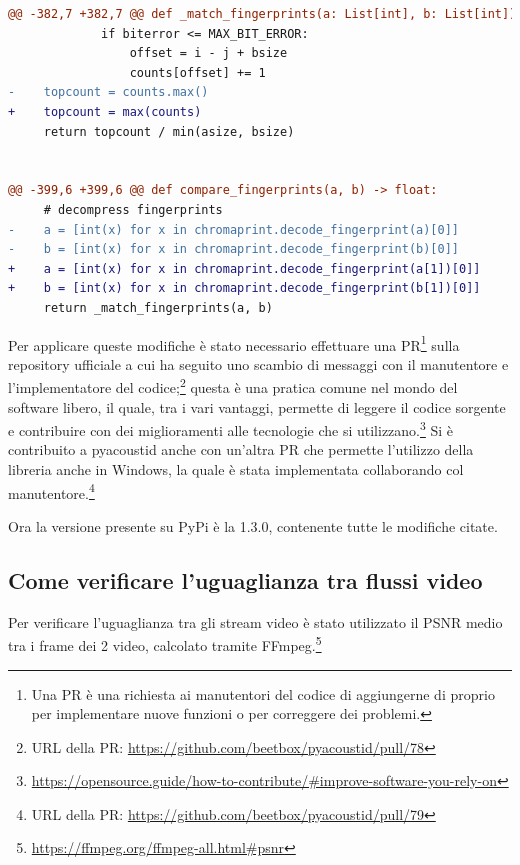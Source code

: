 \begin{lstlisting}[language=diff, caption=Correzioni applicate in pyacoustid nel codice del confronto tra impronte]
@@ -382,7 +382,7 @@ def _match_fingerprints(a: List[int], b: List[int]) -> float:       
             if biterror <= MAX_BIT_ERROR:
                 offset = i - j + bsize
                 counts[offset] += 1
-    topcount = counts.max()
+    topcount = max(counts)
     return topcount / min(asize, bsize)


@@ -399,6 +399,6 @@ def compare_fingerprints(a, b) -> float:
     # decompress fingerprints
-    a = [int(x) for x in chromaprint.decode_fingerprint(a)[0]]
-    b = [int(x) for x in chromaprint.decode_fingerprint(b)[0]]
+    a = [int(x) for x in chromaprint.decode_fingerprint(a[1])[0]]
+    b = [int(x) for x in chromaprint.decode_fingerprint(b[1])[0]]
     return _match_fingerprints(a, b)
\end{lstlisting}

Per applicare queste modifiche è stato necessario effettuare una \ac{PR}\footnote{Una \ac{PR} è una richiesta ai manutentori del codice di aggiungerne di proprio per implementare nuove funzioni o per correggere dei problemi.} sulla repository ufficiale a cui ha seguito uno scambio di messaggi con il manutentore e l'implementatore del codice;\footnote{URL della \ac{PR}: \url{https://github.com/beetbox/pyacoustid/pull/78}} questa è una pratica comune nel mondo del software libero, il quale, tra i vari vantaggi, permette di leggere il codice sorgente e contribuire con dei miglioramenti alle tecnologie che si utilizzano.\footnote{\url{https://opensource.guide/how-to-contribute/\#improve-software-you-rely-on}}
Si è contribuito a pyacoustid anche con un'altra \ac{PR} che permette l'utilizzo della libreria anche in Windows, la quale è stata implementata collaborando col manutentore.\footnote{URL della \ac{PR}: \url{https://github.com/beetbox/pyacoustid/pull/79}}

Ora la versione presente su PyPi è la 1.3.0, contenente tutte le modifiche citate.


\subsection{Come verificare l'uguaglianza tra flussi video} \label{ssec:packager-video}    %
Per verificare l'uguaglianza tra gli stream video è stato utilizzato il \ac{PSNR} medio tra i frame dei 2 video, calcolato tramite FFmpeg.\footnote{\url{https://ffmpeg.org/ffmpeg-all.html\#psnr}}

